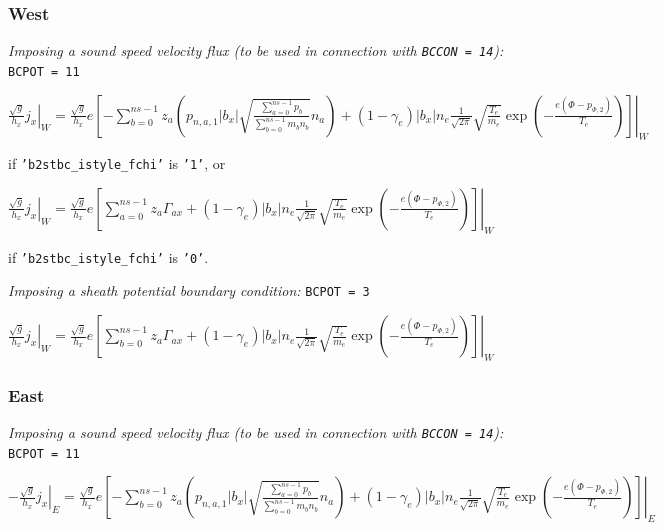 \documentclass[a4paper,10pt]{report}
\begin{document}
\subsubsection{West}

{\em Imposing a sound speed velocity flux (to be used in connection with {\tt BCCON = 14}):} {\tt BCPOT = 11}

\begin{small}
$\left. \frac{\sqrt g}{h_x} j_x \right|_W =
\frac{\sqrt g}{h_x} e \left. \left[
	- \sum \limits_{b=0}^{ns-1} z_a \left(
		p_{n,a,1} |b_x| \sqrt{\frac{\sum \limits_{a=0}^{ns-1} p_b}{\sum \limits_{b=0}^{ns-1} m_b n_b}} n_a
	\right) +
	\left( 1 - \gamma_e \right) |b_x| n_e \frac 1{\sqrt{2\pi}}
	\sqrt{\frac{T_e}{m_e}} \exp \left( -\frac{e \left( \Phi - p_{\Phi,2} \right)}{T_e} \right)
\right] \right|_W$
\end{small}

if {\tt 'b2stbc\_istyle\_fchi'} is {\tt '1'}, or

\begin{small}
$\left. \frac{\sqrt g}{h_x} j_x \right|_W =
\frac{\sqrt g}{h_x} e \left. \left[
	\sum \limits_{a=0}^{ns-1} z_a \Gamma_{ax} +
	\left( 1 - \gamma_e \right) |b_x| n_e \frac 1{\sqrt{2\pi}}
	\sqrt{\frac{T_e}{m_e}} \exp \left( -\frac{e \left( \Phi - p_{\Phi,2} \right)}{T_e} \right)
\right] \right|_W$
\end{small}

if {\tt 'b2stbc\_istyle\_fchi'} is {\tt '0'}.

{\em Imposing a sheath potential boundary condition:} {\tt BCPOT = 3}

$\left. \frac{\sqrt g}{h_x} j_x \right|_W =
\frac{\sqrt g}{h_x} e \left. \left[
	\sum \limits_{b=0}^{ns-1} z_a \Gamma_{ax} +
	\left( 1 - \gamma_e \right) |b_x| n_e \frac 1{\sqrt{2\pi}}
	\sqrt{\frac{T_e}{m_e}}
        \exp \left( -\frac{e \left( \Phi - p_{\Phi,2}\right)}{T_e} \right)
\right] \right|_W$

\subsubsection{East}

{\em Imposing a sound speed velocity flux (to be used in connection with {\tt BCCON = 14}):} {\tt BCPOT = 11}

\begin{small}
$\left. -\frac{\sqrt g}{h_x} j_x \right|_E =
\frac{\sqrt g}{h_x} e \left. \left[
	- \sum \limits_{b=0}^{ns-1} z_a \left(
		p_{n,a,1} |b_x| \sqrt{\frac{\sum \limits_{a=0}^{ns-1} p_b}{\sum \limits_{b=0}^{ns-1} m_b n_b}} n_a
	\right) +
	\left( 1 - \gamma_e \right) |b_x| n_e \frac 1{\sqrt{2\pi}}
	\sqrt{\frac{T_e}{m_e}} \exp \left( -\frac{e \left( \Phi - p_{\Phi,2} \right)}{T_e} \right)
\right] \right|_E$
\end{small}
\end{document}
